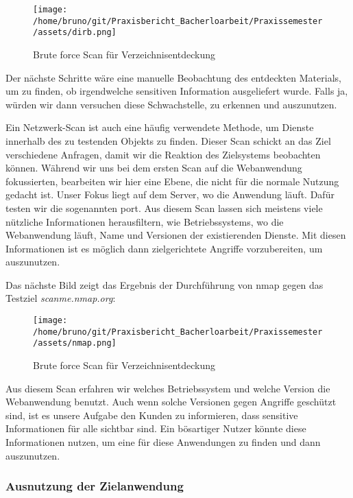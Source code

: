 \begin{figure}[H]
    \centering
    \texttt{[image: /home/bruno/git/Praxisbericht\_Bacherloarbeit/Praxissemester/assets/dirb.png]}
    \caption{Brute force Scan für Verzeichnisentdeckung}
    \centering
\end{figure}

Der nächste Schritte wäre eine manuelle Beobachtung des entdeckten Materials, um zu finden, ob irgendwelche sensitiven Information ausgeliefert wurde. Falls ja, würden wir dann versuchen diese \gls{Schwachstelle}, zu erkennen und auszunutzen.

Ein Netzwerk-Scan ist auch eine häufig verwendete Methode, um Dienste innerhalb des zu testenden Objekts zu finden. Dieser Scan schickt an das Ziel verschiedene Anfragen, damit wir die Reaktion des Zielsystems beobachten können. Während wir uns bei dem ersten Scan auf die Webanwendung fokussierten, bearbeiten wir hier eine Ebene, die nicht für die normale Nutzung gedacht ist. Unser Fokus liegt auf dem Server, wo die Anwendung läuft. Dafür testen wir die sogenannten \gls{port}. Aus diesem Scan lassen sich meistens viele nützliche Informationen herausfiltern, wie Betriebssystems, wo die Webanwendung läuft, Name und Versionen der existierenden Dienste. Mit diesen Informationen ist es möglich dann zielgerichtete Angriffe vorzubereiten, um  auszunutzen.

Das nächste Bild zeigt das Ergebnis der Durchführung von \gls{nmap} gegen das Testziel \textit{scanme.nmap.org}:

\begin{figure}[H]
    \centering
    \texttt{[image: /home/bruno/git/Praxisbericht\_Bacherloarbeit/Praxissemester/assets/nmap.png]}
    \caption{Brute force Scan für Verzeichnisentdeckung}
    \centering
\end{figure}

Aus diesem Scan erfahren wir welches Betriebssystem und welche Version die Webanwendung benutzt. Auch wenn solche Versionen gegen Angriffe geschützt sind, ist es unsere Aufgabe den Kunden zu informieren, dass sensitive Informationen für alle sichtbar sind. Ein bösartiger Nutzer könnte diese Informationen nutzen, um eine  für diese Anwendungen zu finden und dann auszunutzen.

\subsubsection{Ausnutzung der Zielanwendung}


